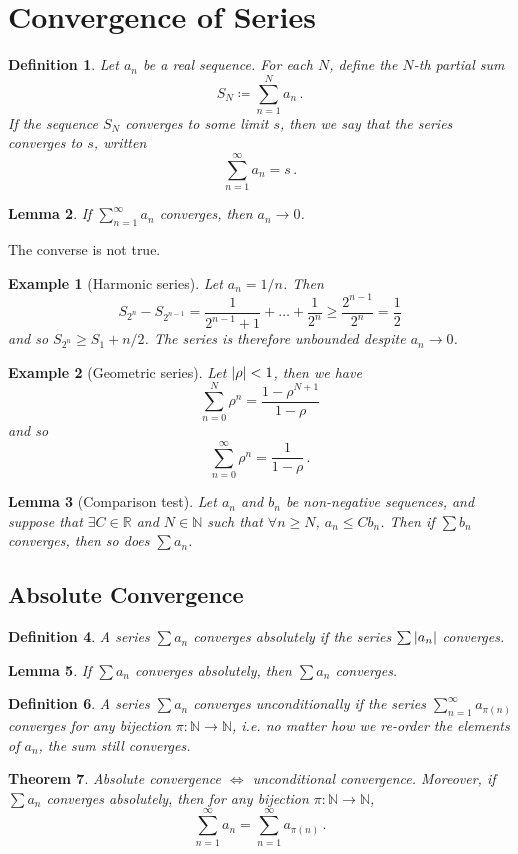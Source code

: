 \documentclass{article}
\theoremstyle{plain}\theoremheaderfont{\normalfont\itshape}\theorembodyfont{\rmfamily}\theoremseparator{.}\newtheorem*{rem}{Remark}\newtheorem*{ex}{Example}\newtheorem*{proof}{Proof}\newtheorem*{altp}{Alternative proof}
\theoremstyle{plain}\theoremheaderfont{\normalfont\bfseries}\theorembodyfont{\rmfamily}\theoremseparator{.}\newtheorem{thm}{Theorem}[section]\newtheorem{lem}[thm]{Lemma}\newtheorem{prop}[thm]{Proposition}\newtheorem*{cor}{Corollary}\newtheorem{defn}[thm]{Definition}\newtheorem{clm}[thm]{Claim}\newtheorem{clminproof}{Claim}
\theoremstyle{break}\theoremheaderfont{\normalfont\itshape}\theorembodyfont{\rmfamily}\theoremseparator{.\medskip}\newtheorem*{proofskip}{Proof}\newtheorem*{exs}{Examples}\newtheorem*{rems}{Remarks}
\theoremstyle{break}\theoremheaderfont{\normalfont\bfseries}\theorembodyfont{\rmfamily}\theoremseparator{.\medskip}\newtheorem{lemskip}[thm]{Lemma}\newtheorem{defnskip}[thm]{Definition}\newtheorem{propskip}[thm]{Proposition}\newtheorem{thmskip}[thm]{Theorem}
\begin{document}
    \section{Convergence of Series}
    \begin{defn}
        Let \(a_n\) be a real sequence. For each \(N\), define the \textit{\(N\)-th partial sum}
        \[S_N\coloneqq\sum_{n=1}^{N}a_n\,.\]
        If the sequence \(S_N\) converges to some limit \(s\), then we say that the \textit{series} converges to \(s\), written
        \[\sum_{n=1}^{\infty}a_n=s\,.\]
    \end{defn}
    \begin{lem}
        If \(\sum_{n=1}^{\infty}a_n\) converges, then \(a_n\to 0\).
    \end{lem}
    The converse is not true.
    \begin{ex}[Harmonic series]
        Let \(a_n=1/n\). Then
        \[S_{2^n}-S_{2^{n-1}}=\frac{1}{2^{n-1}+1}+\dots+\frac{1}{2^n}\ge\frac{2^{n-1}}{2^n}=\frac{1}{2}\]
        and so
        \(S_{2^n}\ge S_1+n/2\). The series is therefore unbounded despite \(a_n\to 0\).
    \end{ex}
    \begin{ex}[Geometric series]
        Let \(\abs{\rho}<1\), then we have
        \[\sum_{n=0}^{N}\rho^n=\frac{1-\rho^{N+1}}{1-\rho}\]
        and so
        \[\sum_{n=0}^{\infty}\rho^n=\frac{1}{1-\rho}\,.\]
    \end{ex}
    \begin{lem}[Comparison test]
        Let \(a_n\) and \(b_n\) be non-negative sequences, and suppose that \(\exists C\in\mathbb{R}\) and \(N\in\mathbb{N}\) such that \(\forall n\ge N\), \(a_n\le Cb_n\). Then if \(\sum b_n\) converges, then so does \(\sum a_n\).
    \end{lem}
    \subsection{Absolute Convergence}
    \begin{defn}
        A series \(\sum a_n\) \textit{converges absolutely} if the series \(\sum\abs{a_n}\) converges.
    \end{defn}
    \begin{lem}
        If \(\sum a_n\) converges absolutely, then \(\sum a_n\) converges.
    \end{lem}
    \begin{defn}
        A series \(\sum a_n\) \textit{converges unconditionally} if the series \(\sum_{n=1}^{\infty}a_{\pi(n)}\) converges for any bijection \(\pi:\mathbb{N}\to\mathbb{N}\), i.e. no matter how we re-order the elements of \(a_n\), the sum still converges.
    \end{defn}
    \begin{thm}
        Absolute convergence \(\iff\) unconditional convergence. Moreover, if \(\sum a_n\) converges absolutely, then for any bijection \(\pi:\mathbb{N}\to\mathbb{N}\),
        \[\sum_{n=1}^{\infty}a_n=\sum_{n=1}^{\infty}a_{\pi(n)}\,.\]
    \end{thm}
\end{document}

